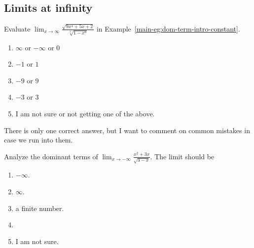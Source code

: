\documentclass[aspectratio=169, 14pt, t]{beamer}  %
\begin{document}
\subsection{Limits at infinity}

\begin{poll}
  Evaluate \(\lim_{x \to \infty} \frac{\sqrt{9x^{4} + 5x + 2}}{\sqrt[3]{1 - x^{6}}}\) in Example~\ref{main-eg:dom-term-intro-constant}.

  \begin{enumerate}
    \item \(\infty\) or \(-\infty\) or \(0\) 
    \item \(-1\) or \(1\) 
    \item \(-9\) or \(9\) 
    \item \(-3\) or \(3\) 
    \item I am not sure or not getting one of the above.
  \end{enumerate}

  There is only one correct answer, but I want to comment on common mistakes in case we run into them.
\end{poll}

%

\begin{poll}
  Analyze the dominant terms of \(\lim_{x \to -\infty} \frac{x^{2}+3x}{\sqrt{3-x}}\). The limit should be

  \begin{enumerate}
    \item \(-\infty\).
    \item \(\infty\). 
    \item a finite number.
    \item
    \item I am not sure.
  \end{enumerate}
\end{poll}
\end{document}
